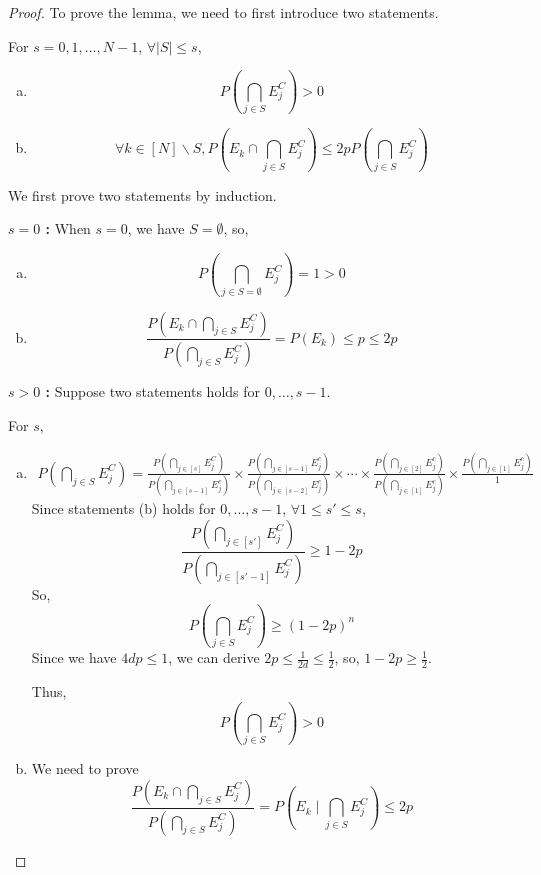 \documentclass{article}
\begin{document}
\begin{proof}
To prove the lemma, we need to first introduce two statements.

For $s=0,1,\ldots,N-1$, $\forall |S| \leq s$,
\begin{enumerate}[(a)]
    \item $$P(\bigcap_{j\in S}E_j^C) > 0$$
    \item $$\forall k\in[N]\backslash S, P(E_k \cap \bigcap_{j\in S}E_j^C) \leq 2p P(\bigcap_{j\in S}E_j^C)$$
\end{enumerate}

We first prove two statements by induction.

\textbf{$s = 0$ :} When $s = 0$, we have $S = \emptyset$, so,
\begin{enumerate}[(a)]
    \item \[
        P(\bigcap_{j\in S=\emptyset} E_j^C) = 1 > 0
    \]
    \item \[
        \frac{P(E_k \cap \bigcap_{j\in S}E_j^C)}{P(\bigcap_{j\in S}E_j^C)} = P(E_k) \leq p \leq 2p
    \]
\end{enumerate}

\textbf{$s > 0$ :} Suppose two statements holds for $0,\ldots,s-1$.

For $s$,

\begin{enumerate}[(a)]
    \item
    \begin{align}\label{eq1}
        P(\bigcap_{j\in S}E_j^C) = 
        \frac{P(\bigcap_{j\in[s]}E_j^C)}{P(\bigcap_{j\in[s-1]}E_j^c)} \times
        \frac{P(\bigcap_{j\in[s-1]}E_j^c)}{P(\bigcap_{j\in[s-2]}E_j^c)} \times
        \cdots \times
        \frac{P(\bigcap_{j\in[2]}E_j^c)}{P(\bigcap_{j\in[1]}E_j^c)}\times
        \frac{P(\bigcap_{j\in[1]}E_j^c)}{1}
    \end{align}
    Since statements (b) holds for $0, \ldots, s-1$, $\forall 1 \leq s'\leq s$,
    \[
        \frac{P(\bigcap_{j\in[s']} E_j^C)}{P(\bigcap_{j\in[s'-1]} E_j^C)} \geq 1-2p
    \]
    So,
    \[
        P(\bigcap_{j\in S}E_j^C) \geq (1-2p)^n
    \]
    Since we have $4dp\leq 1$, we can derive $2p \leq \frac{1}{2d} \leq \frac{1}{2}$, so, $1-2p\geq \frac{1}{2}$.
    
    Thus, \[
        P(\bigcap_{j\in S}E_j^C) > 0
    \]

    \item We need to prove \[
        \frac{P(E_k \cap \bigcap_{j\in S}E_j^C)}{P(\bigcap_{j\in S}E_j^C)} = P(E_k \mid \bigcap_{j\in S}E_j^C) \leq 2p
    \]


\end{enumerate}
\end{proof}
\end{document}
